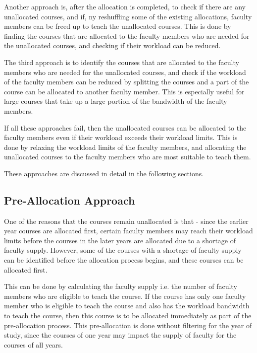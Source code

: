 Another approach is, after the allocation is completed, to check if there are any unallocated courses, and if, ny reshuffling some of the existing allocations, faculty members can be freed up to teach the unallocated courses. This is done by finding the courses that are allocated to the faculty members who are needed for the unallocated courses, and checking if their workload can be reduced.

The third approach is to identify the courses that are allocated to the faculty members who are needed for the unallocated courses, and check if the workload of the faculty members can be reduced by splitting the courses and a part of the course can be allocated to another faculty member. This is especially useful for large courses that take up a large portion of the bandwidth of the faculty members.

If all these approaches fail, then the unallocated courses can be allocated to the faculty members even if their workload exceeds their workload limits. This is done by relaxing the workload limits of the faculty members, and allocating the unallocated courses to the faculty members who are most suitable to teach them.

These approaches are discussed in detail in the following sections.

\subsection{Pre-Allocation Approach}
\label{sec:pre_allocation}

One of the reasons that the courses remain unallocated is that - since the earlier year courses are allocated first, certain faculty members may reach their workload limits before the courses in the later years are allocated due to a shortage of faculty supply. However, some of the courses with a shortage of faculty supply can be identified before the allocation process begins, and these courses can be allocated first.

This can be done by calculating the faculty supply i.e. the number of faculty members who are eligible to teach the course. If the course has only one faculty member who is eligible to teach the course and also has the workload bandwidth to teach the course, then this course is to be allocated immediately as part of the pre-allocation process. This pre-allocation is done without filtering for the year of study, since the courses of one year may impact the supply of faculty for the courses of all years.

